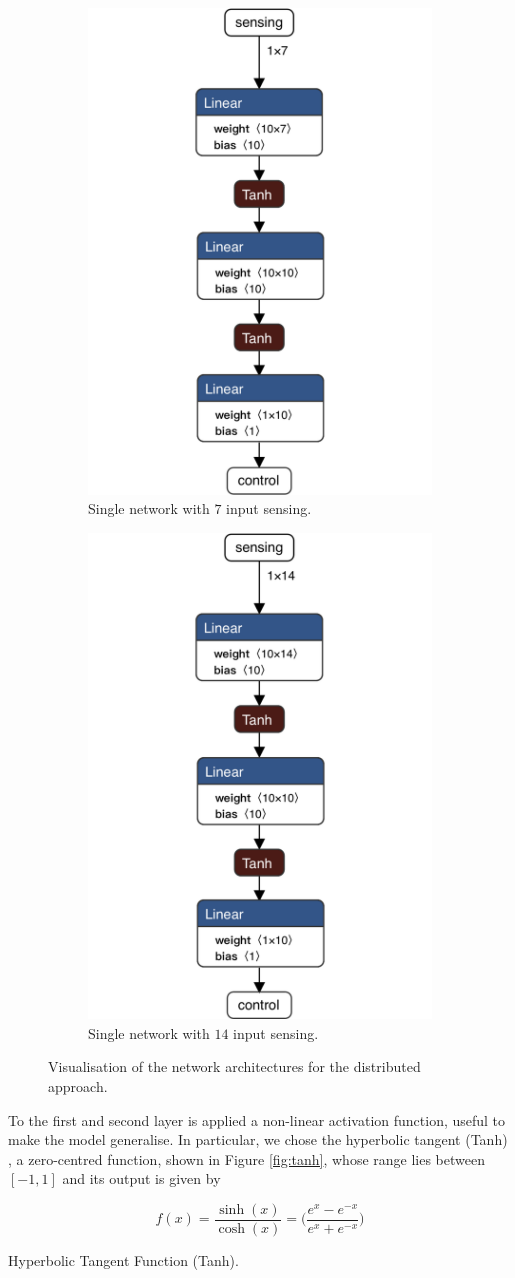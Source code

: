 \begin{figure}[htb]
	\centering
	\begin{subfigure}[h]{0.495\textwidth}
		\centering
		\includegraphics[width=.3\textwidth]{contents/images/task1distributed@4x}%
		\caption{Single network with $7$ input sensing.}
		\label{fig:singlenet7distributed1}
	\end{subfigure}
	\hfill
	\begin{subfigure}[h]{0.495\textwidth}
		\centering
		\includegraphics[width=.3\textwidth]{contents/images/task1distributed_all@4x}
		\caption{Single network with $14$ input sensing.}
		\label{fig:singlenet14distributed1}
	\end{subfigure}
	\caption{Visualisation of the network architectures for the distributed 
		approach.}
	\label{fig:singlenetdistributed1}
\end{figure}

To the first and second layer is applied a non-linear activation function, 
useful to make the model generalise. 
In particular, we chose the hyperbolic tangent (Tanh) 
\cite[see][]{kalman1992tanh}, a zero-centred function, shown in Figure 
\ref{fig:tanh}, whose range lies between $[-1, 1]$ and its output is given by

\begin{Equation}[H]
	\centering
	\begin{equation}
	f(x)= \frac{\sinh (x)}{\cosh (x)} = \bigg( \frac{e^x - e^{-x}}{e^x + 
		e^{-x}}\bigg)
	\end{equation}
	\caption{Hyperbolic Tangent Function (Tanh).}
	\label{eq:tanh}
\end{Equation}

